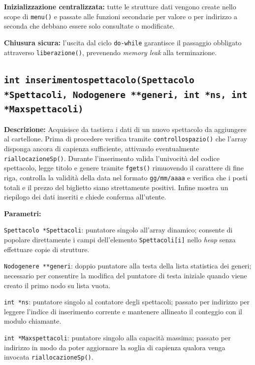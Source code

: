 \documentclass[11pt,a4paper,oneside,openany]{book}
\newenvironment{listacomp}{%
    \small
    \begin{list}{\textendash}{%
        \setlength{\topsep}{2pt}%
        \setlength{\partopsep}{0pt}%
        \setlength{\itemsep}{1pt}%
        \setlength{\parsep}{0pt}%
        \setlength{\leftmargin}{1.2em}%
    }%
}{%
    \end{list}%
}
\begin{document}
\begin{listacomp}
    \item \textbf{Inizializzazione centralizzata:} tutte le strutture dati vengono create nello scope di \texttt{menu()} e passate alle funzioni secondarie per valore o per indirizzo a seconda che debbano essere solo consultate o modificate.
    \item \textbf{Chiusura sicura:} l'uscita dal ciclo \texttt{do-while} garantisce il passaggio obbligato attraverso \texttt{liberazione()}, prevenendo \emph{memory leak} alla terminazione.
\end{listacomp}

\subsection[inserimentospettacolo()]{\texttt{int inserimentospettacolo(Spettacolo *Spettacoli, Nodogenere **generi, int *ns, int *Maxspettacoli)}}

\noindent\textbf{Descrizione:}
Acquisisce da tastiera i dati di un nuovo spettacolo da aggiungere al cartellone. Prima di procedere verifica tramite \texttt{controllospazio()} che l'array disponga ancora di capienza sufficiente, attivando eventualmente \texttt{riallocazioneSp()}. Durante l'inserimento valida l'univocità del codice spettacolo, legge titolo e genere tramite \texttt{fgets()} rimuovendo il carattere di fine riga, controlla la validità della data nel formato \texttt{gg/mm/aaaa} e verifica che i posti totali e il prezzo del biglietto siano strettamente positivi. Infine mostra un riepilogo dei dati inseriti e chiede conferma all'utente.

\noindent\textbf{Parametri:}
\begin{listacomp}
    \item \texttt{Spettacolo *Spettacoli}: puntatore singolo all'array dinamico; consente di popolare direttamente i campi dell'elemento \texttt{Spettacoli[i]} nello \emph{heap} senza effettuare copie di strutture.
    \item \texttt{Nodogenere **generi}: doppio puntatore alla testa della lista statistica dei generi; necessario per consentire la modifica del puntatore di testa iniziale quando viene creato il primo nodo su lista vuota.
    \item \texttt{int *ns}: puntatore singolo al contatore degli spettacoli; passato per indirizzo per leggere l'indice di inserimento corrente e mantenere allineato il conteggio con il modulo chiamante.
    \item \texttt{int *Maxspettacoli}: puntatore singolo alla capacità massima; passato per indirizzo in modo da poter aggiornare la soglia di capienza qualora venga invocata \texttt{riallocazioneSp()}.
\end{listacomp}
\end{document}
